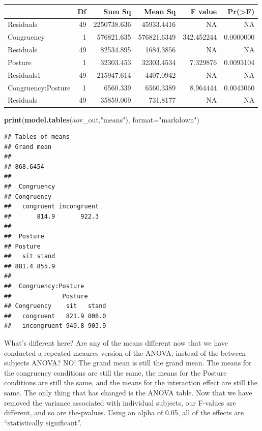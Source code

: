 \documentclass[]{book}
\newenvironment{Shaded}{\begin{snugshade}}{\end{snugshade}}
\newcommand{\KeywordTok}[1]{\textcolor[rgb]{0.13,0.29,0.53}{\textbf{{#1}}}}
\newcommand{\DataTypeTok}[1]{\textcolor[rgb]{0.13,0.29,0.53}{{#1}}}
\newcommand{\StringTok}[1]{\textcolor[rgb]{0.31,0.60,0.02}{{#1}}}
\newcommand{\NormalTok}[1]{{#1}}
\theoremstyle{definition}
\theoremstyle{definition}
\theoremstyle{definition}
\theoremstyle{remark}
\begin{document}
\begin{tabular}{l|r|r|r|r|r}
\hline
  & Df & Sum Sq & Mean Sq & F value & Pr(>F)\\
\hline
Residuals & 49 & 2250738.636 & 45933.4416 & NA & NA\\
\hline
Congruency & 1 & 576821.635 & 576821.6349 & 342.452244 & 0.0000000\\
\hline
Residuals & 49 & 82534.895 & 1684.3856 & NA & NA\\
\hline
Posture & 1 & 32303.453 & 32303.4534 & 7.329876 & 0.0093104\\
\hline
Residuals1 & 49 & 215947.614 & 4407.0942 & NA & NA\\
\hline
Congruency:Posture & 1 & 6560.339 & 6560.3389 & 8.964444 & 0.0043060\\
\hline
Residuals & 49 & 35859.069 & 731.8177 & NA & NA\\
\hline
\end{tabular}

\begin{Shaded}
\begin{Highlighting}[]
\KeywordTok{print}\NormalTok{(}\KeywordTok{model.tables}\NormalTok{(aov_out,}\StringTok{"means"}\NormalTok{), }\DataTypeTok{format=}\StringTok{"markdown"}\NormalTok{)}
\end{Highlighting}
\end{Shaded}

\begin{verbatim}
## Tables of means
## Grand mean
##          
## 868.6454 
## 
##  Congruency 
## Congruency
##   congruent incongruent 
##       814.9       922.3 
## 
##  Posture 
## Posture
##   sit stand 
## 881.4 855.9 
## 
##  Congruency:Posture 
##              Posture
## Congruency    sit   stand
##   congruent   821.9 808.0
##   incongruent 940.8 903.9
\end{verbatim}

What's different here? Are any of the means different now that we have
conducted a repeated-meaures version of the ANOVA, instead of the
between-subjects ANOVA? NO! The grand mean is still the grand mean. The
means for the congruency conditions are still the same, the means for
the Posture conditions are still the same, and the means for the
interaction effect are still the same. The only thing that has changed
is the ANOVA table. Now that we have removed the variance associated
with individual subjects, our F-values are different, and so are
the-pvalues. Using an alpha of 0.05, all of the effects are
``statistically significant''.
\end{document}
